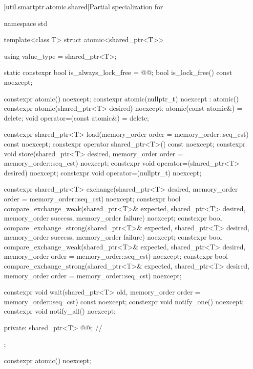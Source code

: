 [util.smartptr.atomic.shared]{Partial specialization for }
%
\begin{codeblock}
namespace std {
  template<class T> struct atomic<shared_ptr<T>> {
    using value_type = shared_ptr<T>;

    static constexpr bool is_always_lock_free = @@;
    bool is_lock_free() const noexcept;

    constexpr atomic() noexcept;
    constexpr atomic(nullptr_t) noexcept : atomic() { }
    constexpr atomic(shared_ptr<T> desired) noexcept;
    atomic(const atomic&) = delete;
    void operator=(const atomic&) = delete;

    constexpr shared_ptr<T> load(memory_order order = memory_order::seq_cst) const noexcept;
    constexpr operator shared_ptr<T>() const noexcept;
    constexpr void store(shared_ptr<T> desired,
                         memory_order order = memory_order::seq_cst) noexcept;
    constexpr void operator=(shared_ptr<T> desired) noexcept;
    constexpr void operator=(nullptr_t) noexcept;

    constexpr shared_ptr<T> exchange(shared_ptr<T> desired,
                                     memory_order order = memory_order::seq_cst) noexcept;
    constexpr bool compare_exchange_weak(shared_ptr<T>& expected, shared_ptr<T> desired,
                                         memory_order success, memory_order failure) noexcept;
    constexpr bool compare_exchange_strong(shared_ptr<T>& expected, shared_ptr<T> desired,
                                           memory_order success, memory_order failure) noexcept;
    constexpr bool compare_exchange_weak(shared_ptr<T>& expected, shared_ptr<T> desired,
                                         memory_order order = memory_order::seq_cst) noexcept;
    constexpr bool compare_exchange_strong(shared_ptr<T>& expected, shared_ptr<T> desired,
                                           memory_order order = memory_order::seq_cst) noexcept;

    constexpr void wait(shared_ptr<T> old,
                        memory_order order = memory_order::seq_cst) const noexcept;
    constexpr void notify_one() noexcept;
    constexpr void notify_all() noexcept;

  private:
    shared_ptr<T> @@;            // \expos
  };
}
\end{codeblock}

%
\begin{itemdecl}
constexpr atomic() noexcept;
\end{itemdecl}

